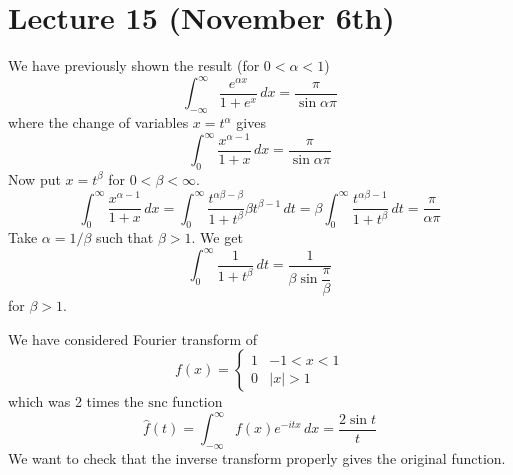 \section{Lecture 15 (November 6th)}
\begin{recall}
We have previously shown the result (for $0<\alpha <1$) 
\[\int ^{\infty }_{-\infty }\dfrac{e^{\alpha x}}{1+e^{x}}\,dx=\dfrac{\pi }{\sin \alpha \pi }\]
where the change of variables $x=t^{\alpha }$ gives
\[\int ^{\infty }_{0}\dfrac{x^{\alpha -1}}{1+x}\,dx=\dfrac{\pi }{\sin \alpha \pi }\]
Now put $x=t^{\beta }$ for $0<\beta <\infty $.
\[\int ^{\infty }_{0}\dfrac{x^{\alpha -1}}{1+x}\,dx=\int ^{\infty }_{0}\dfrac{t^{\alpha \beta -\beta }}{1+t^{\beta }}\beta t^{\beta-1}\,dt=\beta \int ^{\infty }_{0}\dfrac{t^{\alpha \beta -1}}{1+t^{\beta }}\,dt=\dfrac{\pi }{\alpha \pi }\]
Take $\alpha =1/\beta $ such that $\beta >1$. We get
\[\int ^{\infty }_{0}\dfrac{1}{1+t^{\beta }}\,dt=\dfrac{1}{\beta \sin \dfrac{\pi }{\beta }}\]
for $\beta >1$. 
\end{recall}
\vspace{2ex}
\begin{recall}
We have considered Fourier transform of 
\[f(x)=\begin{cases}
1&-1<x<1\\
0&|x|>1
\end{cases}\]
which was 2 times the $\mathrm{snc}$ function
\[\hat{f}(t)=\int ^{\infty }_{-\infty }f(x)e^{-itx}\,dx=\dfrac{2\sin t}{t}\]
We want to check that the inverse transform properly gives the original function.
\end{recall}
\vspace{2ex}
